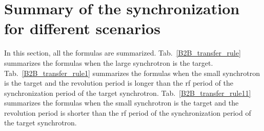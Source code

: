 \section{Summary of the synchronization for different scenarios}
In this section, all the formulas are summarized.  Tab.~\ref{B2B_transfer_rule} summarizes the formulas when the large synchrotron is the target. Tab.~\ref{B2B_transfer_rule1} summarizes the formulas when the small synchrotron is the target and the revolution period is longer than the rf period of the synchronization period of the target synchrotron. Tab.~\ref{B2B_transfer_rule11} summarizes the formulas when the small synchrotron is the target and the revolution period is shorter than the rf period of the synchronization period of the target synchrotron.
